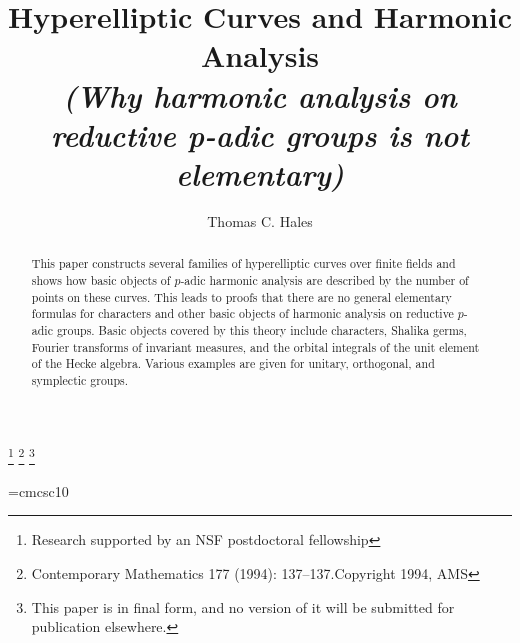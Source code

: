 \documentclass{amsart}
\begin{document}
\title[Hyperelliptic Curves]{Hyperelliptic Curves and Harmonic Analysis\\
      {\it (Why harmonic analysis on reductive 
                       p-adic groups is not elementary) }}
\author{Thomas C. Hales}
\address{Department of Mathematics, University of Michigan, Ann Arbor, Michigan}


%

\begin{abstract}
This paper constructs several families of hyperelliptic
curves over finite fields and shows how basic objects
of $p$-adic harmonic analysis are described by the
number of points on these curves.  This leads to proofs
that there are no general elementary formulas for
characters and other basic objects of harmonic analysis
on reductive $p$-adic groups.  Basic objects covered
by this theory include characters, Shalika germs,
Fourier transforms of invariant measures, and the
orbital integrals of the unit element of the Hecke algebra.
Various examples are given for unitary, orthogonal, and
symplectic groups.
\end{abstract}

\thanks{Research supported by an NSF postdoctoral fellowship}
\thanks{Contemporary Mathematics 177 (1994): 137--137.\quad Copyright 1994, AMS}
\thanks{This paper is in final form, and no version of it
will be submitted for publication elsewhere.}



\newcommand\Fq{{\Bbb F}_q}
\newcommand\PSp{{P\! Sp}}
\newcommand\calO{{\mathcal O}}
\newcommand\B{{\frak B}}
\newcommand\h{{\frak h}}
\newcommand\g{{\frak g}}
\newcommand\p{{\frak p}}   %
\newcommand\gsp{{\frak gsp}}
\newcommand\so{{\frak so}}
\newcommand\bP{{\Bbb P}}
\newcommand\G{{\Bbb G}}
\newcommand\Q{{\Bbb Q}}
\newcommand\Z{{\Bbb Z}}
\newcommand\C{{\Bbb C}}
\newcommand\Ima{{\mathcal I\hskip-.2em m}}
\newcommand\bGamma{\bar\Gamma}
\newcommand\diag{\hbox{diag}}
\newcommand\bk{\bar k}
\newcommand\Gal{\operatorname{Gal}}
\newcommand\bF{{\bar F}}
\newcommand\vvol{\operatorname{vol}}

\font\smc=cmcsc10
\def\proclaim#1{\medbreak\medskip\noindent 
  {\smc#1.\enspace}\sl} 
\def\endproclaim{\par\rm 
  \ifdim\lastskip<\medskipamount\removelastskip 
  \penalty55\medskip\fi} 

\end{document}
